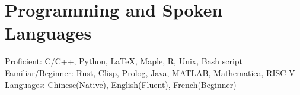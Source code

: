 \section{\sc Programming and Spoken Languages}
Proficient: C/C++, Python, \LaTeX, Maple, R, Unix, Bash script\\
Familiar/Beginner: Rust, Clisp, Prolog, Java, MATLAB, Mathematica, RISC-V\\
Languages: Chinese(Native), English(Fluent), French(Beginner)
\endinput